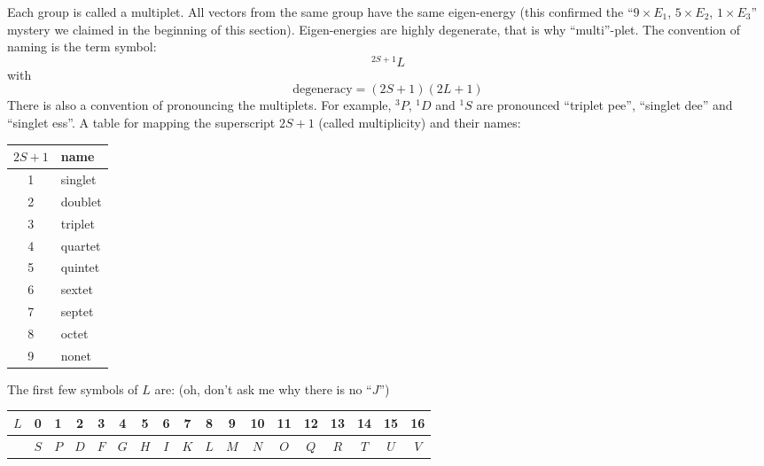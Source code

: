 Each group is called a multiplet. All vectors from the same group have the same eigen-energy
(this confirmed the ``$9\times E_1$, $5\times E_2$, $1\times E_3$'' mystery we claimed in
the beginning of this section). Eigen-energies are highly degenerate,
that is why ``multi''-plet. The convention of naming is the term symbol:
\begin{equation} \label{eq:mtp}
^{2S+1}L
\end{equation}
with
\begin{equation} \label{eq:mtpDegen}
\mathrm{degeneracy} = (2S+1)(2L+1)
\end{equation}
%
There is also a convention of pronouncing the multiplets. For example,
$^3P$, $^1D$ and $^1S$ are pronounced ``triplet pee'', ``singlet dee'' and
``singlet ess''. A table for mapping the superscript $2S+1$ (called multiplicity)
and their names:
\begin{center}
\begin{tabular}{|c|l|}
\hline
 $2S+1$ & name \\ \hline
 1 & singlet \\
 2 & doublet \\
 3 & triplet \\
 4 & quartet \\
 5 & quintet \\
 6 & sextet \\
 7 & septet \\
 8 & octet \\
 9 & nonet \\
\hline
\end{tabular}
\end{center}

The first few symbols of $L$ are: (oh, don't ask me why there is no ``$J$'')
\begin{center}
\begin{tabular}{|c|c c c c c c c c c c c c c c c c c|}
\hline
 $L$ & 0 & 1 & 2 & 3 & 4 & 5 & 6 & 7 & 8 & 9 & 10 & 11 & 12 & 13 & 14 & 15 & 16 \\ \hline
     & $S$ & $P$ & $D$ & $F$ & $G$ & $H$ & $I$ & $K$ & $L$ & $M$ & $N$ & $O$ & $Q$ & $R$ & $T$ & $U$ & $V$ \\
\hline
\end{tabular}
\end{center}

